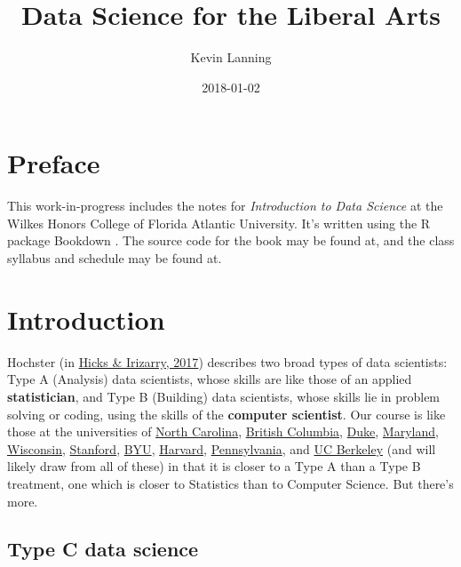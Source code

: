 \documentclass[]{book}
\title{Data Science for the Liberal Arts}
\author{Kevin Lanning}
\date{2018-01-02}
\theoremstyle{definition}
\theoremstyle{definition}
\theoremstyle{definition}
\theoremstyle{remark}
\begin{document}
\maketitle

{
\setcounter{tocdepth}{1}
\tableofcontents
}
\hypertarget{preface}{%
\chapter{Preface}\label{preface}}

This work-in-progress includes the notes for \emph{\emph{Introduction to
Data Science}} at the Wilkes Honors College of Florida Atlantic
University. It's written using the R package Bookdown
\citep{R-bookdown}. The source code for the book may be found at, and
the class syllabus and schedule may be found at.

\hypertarget{introduction}{%
\chapter{Introduction}\label{introduction}}

Hochster (in
\href{https://arxiv.org/ftp/arxiv/papers/1612/1612.07140.pdf}{Hicks \&
Irizarry, 2017}) describes two broad types of data scientists: Type A
(Analysis) data scientists, whose skills are like those of an applied
\textbf{statistician}, and Type B (Building) data scientists, whose
skills lie in problem solving or coding, using the skills of the
\textbf{computer scientist}. Our course is like those at the
universities of \href{https://idc9.github.io/stor390/}{North Carolina},
\href{https://github.com/STAT545-UBC/STAT545-UBC.github.io}{British
Columbia},
\href{https://www2.stat.duke.edu/courses/Fall15/sta112.01/}{Duke},
\href{http://www.hcbravo.org/IntroDataSci/calendar/}{Maryland},
\href{http://pages.stat.wisc.edu/~yandell/R_for_data_sciences/syllabus.html}{Wisconsin},
\href{https://github.com/dcl-2017-04/curriculum}{Stanford},
\href{https://byuistats.github.io/M335/syllabus.html}{BYU},
\href{http://datasciencelabs.github.io/}{Harvard},
\href{https://github.com/MUSA-620-Spring-2017/Course-Materials}{Pennsylvania},
and \href{https://github.com/FAUDataScience/stat259}{UC Berkeley} (and
will likely draw from all of these) in that it is closer to a Type A
than a Type B treatment, one which is closer to Statistics than to
Computer Science. But there's more.

\hypertarget{type-c-data-science}{%
\section{Type C data science}\label{type-c-data-science}}
\end{document}
